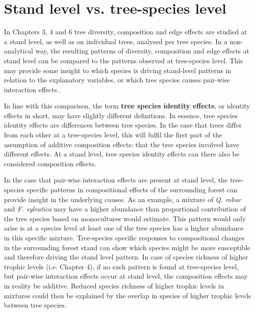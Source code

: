 \documentclass[b5paper,10pt]{book} %
\begin{document}
	\section{Stand level vs. tree-species level}

	In Chapters 3, 4 and 6 tree diversity, composition and edge effects are studied at a stand level, as well as on individual trees, analysed per tree species. In a non-analytical way, the resulting patterns of diversity, composition and edge effects at stand level can be compared to the patterns observed at tree-species level. This may provide some insight to which species is driving stand-level patterns in relation to the explanatory variables, or which tree species causes pair-wise interaction effects.. 

	In line with this comparison, the term \textbf{tree species identity effects}, or identity effects in short, may have slightly different definitions. In essence, tree species identity effects are differences between tree species. In the case that trees differ from each other at a tree-species level, this will fulfil the first part of the assumption of additive composition effects: that the tree species involved have different effects. At a stand level, tree species identity effects can there also be considered composition effects.

	In the case that pair-wise interaction effects are present at stand level, the tree-species specific patterns in compositional effects of the surrounding forest can provide insight in the underlying causes. As an example, a mixture of \textit{Q. robur} and \textit{F. sylvatica} may have a higher abundance than proportional contribution of the tree species based on monocultures would estimate. This pattern would only arise is at a species level at least one of the tree species has a higher abundance in this specific mixture. Tree-species specific responses to compositional changes in the surrounding forest stand can show which species might be more susceptible and therefore driving the stand level pattern. In case of species richness of higher trophic levels (i.e. Chapter 4), if no such pattern is found at tree-species level, but pair-wise interaction effects occur at stand level, the composition effects may in reality be additive. Reduced species richness of higher trophic levels in mixtures could then be explained by the overlap in species of higher trophic levels between tree species. 
\end{document}
